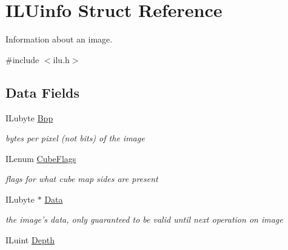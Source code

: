\hypertarget{struct_i_l_uinfo}{\section{I\-L\-Uinfo Struct Reference}
\label{struct_i_l_uinfo}
}


Information about an image.  




{\ttfamily \#include $<$ilu.\-h$>$}

\subsection*{Data Fields}
\begin{DoxyCompactItemize}
\item 
\hypertarget{struct_i_l_uinfo_acb619433784a0e26c0f1f18b3700c9f7}{I\-Lubyte \hyperlink{struct_i_l_uinfo_acb619433784a0e26c0f1f18b3700c9f7}{Bpp}}\label{struct_i_l_uinfo_acb619433784a0e26c0f1f18b3700c9f7}

\begin{DoxyCompactList}\small\item\em bytes per pixel (not bits) of the image \end{DoxyCompactList}\item 
\hypertarget{struct_i_l_uinfo_a2141dcf3ce36303a8c31d417d9337034}{I\-Lenum \hyperlink{struct_i_l_uinfo_a2141dcf3ce36303a8c31d417d9337034}{Cube\-Flags}}\label{struct_i_l_uinfo_a2141dcf3ce36303a8c31d417d9337034}

\begin{DoxyCompactList}\small\item\em flags for what cube map sides are present \end{DoxyCompactList}\item 
\hypertarget{struct_i_l_uinfo_a32fd28ac5d89e3ef2f9151330af0149d}{I\-Lubyte $\ast$ \hyperlink{struct_i_l_uinfo_a32fd28ac5d89e3ef2f9151330af0149d}{Data}}\label{struct_i_l_uinfo_a32fd28ac5d89e3ef2f9151330af0149d}

\begin{DoxyCompactList}\small\item\em the image's data, only guaranteed to be valid until next operation on image \end{DoxyCompactList}\item 
\hypertarget{struct_i_l_uinfo_a2a4c47a9713bee335a0830b336bdc951}{I\-Luint \hyperlink{struct_i_l_uinfo_a2a4c47a9713bee335a0830b336bdc951}{Depth}}\label{struct_i_l_uinfo_a2a4c47a9713bee335a0830b336bdc951}


\end{DoxyCompactItemize}
